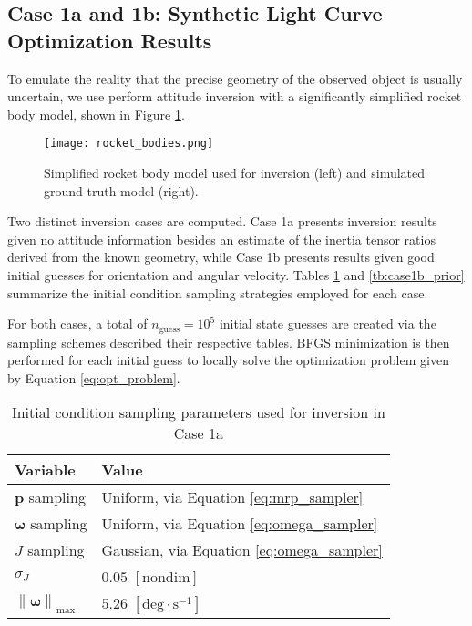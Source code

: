 \documentclass[a4paper,twocolumn]{spaceDebrisC} %
\newcommand{\vctr}[1]{\bm{#1}}
\newcommand{\norm}[1]{\left\lVert#1\right\rVert}
\newcommand{\figmed}[0]{0.4\textwidth}
\begin{document}
\subsection{Case 1a and 1b: Synthetic Light Curve Optimization Results}

To emulate the reality that the precise geometry of the observed object is usually uncertain, we use perform attitude inversion with a significantly simplified rocket body model, shown in Figure \ref{fig:rb_models}.

\begin{figure}[H]
  \centering
  \texttt{[image: rocket\_bodies.png]}
  \caption{Simplified rocket body model used for inversion (left) and simulated ground truth model (right).}
  \label{fig:rb_models}
\end{figure}

Two distinct inversion cases are computed. Case 1a presents inversion results given no attitude information besides an estimate of the inertia tensor ratios derived from the known geometry, while Case 1b presents results given good initial guesses for orientation and angular velocity. Tables \ref{tb:case1a_prior} and \ref{tb:case1b_prior} summarize the initial condition sampling strategies employed for each case.

For both cases, a total of $n_\text{guess}=10^5$ initial state guesses are created via the sampling schemes described their respective tables. BFGS minimization is then performed for each initial guess to locally solve the optimization problem given by Equation \ref{eq:opt_problem}.

\begin{table}[H]
  \centering
  \caption{Initial condition sampling parameters used for inversion in Case 1a}
  \vspace*{6pt}
  \begin{tabular}{|l|l|}
  \hline
  \textbf{Variable} & \textbf{Value} \\ \hline
  $\vctr{p}$ sampling & Uniform, via Equation \ref{eq:mrp_sampler} \\ \hline
  $\vctr{\omega}$ sampling & Uniform, via Equation \ref{eq:omega_sampler} \\ \hline
  $J$ sampling & Gaussian, via Equation \ref{eq:omega_sampler} \\ \hline
  $\sigma_J$ & $0.05$ $[\text{nondim}]$ \\ \hline
  $\norm{\vctr{\omega}}_\text{max}$ & $5.26$ $[\text{deg}\cdot \text{s}^{-1}]$ \\ \hline
\end{tabular}
  \label{tb:case1a_prior}
\end{table}
\end{document}
